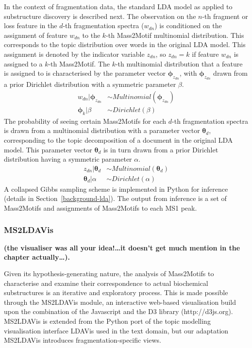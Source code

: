 In the context of fragmentation data, the standard LDA model as applied to substructure discovery is described next. The observation on the $n$-th fragment or loss feature in the $d$-th fragmentation spectra ($w_{dn}$) is conditioned on the assignment of feature $w_{dn}$ to the $k$-th Mass2Motif multinomial distribution. This corresponds to the topic distribution over words in the original LDA model. This assignment is denoted by the indicator variable $z_{dn}$, so $z_{dn}=k$ if feature $w_{dn}$ is assigned to a $k$-th Mass2Motif. The $k$-th multinomial distribution that a feature is assigned to is characterised by the parameter vector $\boldsymbol{\phi}_{z_{dn}}$, with $\boldsymbol{\phi}_{z_{dn}}$ drawn from a prior Dirichlet distribution with a symmetric parameter $\beta$. 
\begin{align}
w_{dn} \vert \boldsymbol{\phi}_{z_{dn}} &\sim Multinomial(\boldsymbol{\phi}_{z_{dn}}) \\
\boldsymbol{\phi}_{k} \vert \beta &\sim Dirichlet(\beta)
\end{align}
The probability of seeing certain Mass2Motifs for each $d$-th fragmentation spectra is drawn from a multinomial distribution with a parameter vector $\boldsymbol{\theta}_{d}$, corresponding to the topic decomposition of a document in the original LDA model. This parameter vector $\boldsymbol{\theta}_{d}$ is in turn drawn from a prior Dirichlet distribution having a symmetric parameter $\alpha$. 
\begin{align}
z_{dn} \vert \boldsymbol{\theta}_{d} &\sim Multinomial(\boldsymbol{\theta}_{d}) \\
\boldsymbol{\theta}_{d} \vert \alpha &\sim Dirichlet(\alpha)
\end{align}
A collapsed Gibbs sampling scheme is implemented in Python for inference (details in Section~\ref{background-lda}). The output from inference is a set of Mass2Motifs and assignments of Mass2Motifs to each MS1 peak. 

\subsubsection{MS2LDAVis}

\textbf{(the visualiser was all your idea!…it doesn’t get much mention in the chapter actually…).}

Given its hypothesis-generating nature, the analysis of Mass2Motifs to characterise and examine their correspondence to actual biochemical substructures is an iterative and exploratory process. This is made possible through the MS2LDAVis module, an interactive web-based visualisation build upon the combination of the Javascript and the D3 library (http://d3js.org). MS2LDAVis is extended from the Python port of the topic modelling visualisation interface LDAVis \cite{Sievert2014} used in the text domain, but our adaptation MS2LDAVis introduces fragmentation-specific views.

